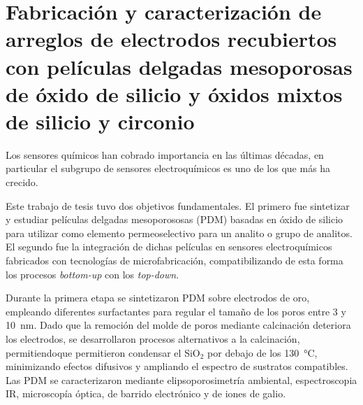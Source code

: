 \mtcaddchapter[Resumen]

\section*{\centering\large{\bfseries{Fabricación y caracterización de arreglos de electrodos recubiertos con películas delgadas mesoporosas de óxido de silicio y óxidos mixtos de silicio y circonio}}}

\vspace*{\fill}
Los sensores químicos han cobrado importancia en las últimas décadas, en particular el subgrupo de sensores electroquímicos es uno de los que más ha crecido. 


Este trabajo de tesis tuvo dos objetivos fundamentales. El primero fue sintetizar y estudiar películas delgadas mesoporososas (PDM) basadas en óxido de silicio para utilizar como elemento permeoselectivo para un analito o grupo de analitos. El segundo fue la integración de dichas películas en sensores electroquímicos fabricados con tecnologías de microfabricación, compatibilizando de esta forma los procesos \textit{bottom-up} con los \textit{top-down}.

Durante la primera etapa se sintetizaron PDM sobre electrodos de oro, empleando diferentes surfactantes para regular el tamaño de los poros entre 3 y \SI{10}{\nm}. Dado que la remoción del molde de poros mediante calcinación deteriora los electrodos, se desarrollaron procesos alternativos a la calcinación, permitiendoque permitieron condensar el SiO$_2$ por debajo de los \SI{130}{\celsius}, minimizando efectos difusivos y ampliando el espectro de sustratos compatibles. Las PDM se caracterizaron mediante elipsoporosimetría ambiental, espectroscopia IR, microscopía óptica, de barrido electrónico y de iones de galio.


